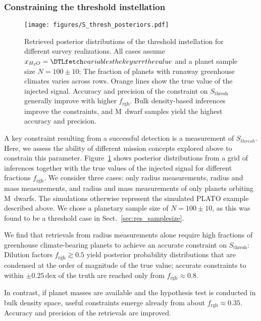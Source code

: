 \documentclass[twocolumn,twocolappendix]{aastex631}
\begin{document}
\subsubsection{Constraining the threshold instellation}\label{sec:res_constrain-S_thresh}
\begin{figure}[ht!]
    \begin{centering}
        \texttt{[image: figures/S\_thresh\_posteriors.pdf]}
        \caption{
            Retrieved posterior distributions of the threshold instellation for different survey realizations.
            All cases assume $x_{H_2O} = \var{wrr}$ and a planet sample size $N=100\pm10$; The fraction of planets with runaway greenhouse climates varies across rows.
            Orange lines show the true value of the injected signal.
            Accuracy and precision of the constraint on $S_\mathrm{thresh}$ generally improve with higher $f_\mathrm{rgh}$.
            Bulk density-based inferences improve the constraints, and M~dwarf samples yield the highest accuracy and precision.
        }
        \label{fig:posterior_surveys}
    \end{centering}
\end{figure}
A key constraint resulting from a successful detection is a measurement of $S_{thresh}$.
Here, we assess the ability of different mission concepts explored above to constrain this parameter.
Figure~\ref{fig:posterior_surveys} shows posterior distributions from a grid of inferences together with the true values of the injected signal for different fractions $f_\mathrm{rgh}$.
We consider three cases: only radius measurements, radius and mass measurements, and radius and mass measurements of only planets orbiting M~dwarfs.
The simulations otherwise represent the simulated PLATO example described above.
We chose a planetary sample size of $N=100\pm10$, as this was found to be a threshold case in Sect.~\ref{sec:res_samplesize}.

We find that retrievals from radius measurements alone require high fractions of greenhouse climate-bearing planets to achieve an accurate constraint on $S_\mathrm{thresh}$:
Dilution factors $f_\mathrm{rgh} \gtrsim 0.5$ yield posterior probability distributions that are condensed at the order of magnitude of the true value; accurate constraints to within $\pm 0.25\,\mathrm{dex}$ of the truth are reached only from $f_\mathrm{rgh} \approx 0.8$.

In contrast, if planet masses are available and the hypothesis test is conducted in bulk density space, useful constraints emerge already from about $f_\mathrm{rgh} \approx 0.35$.
Accuracy and precision of the retrievals are improved.
\end{document}

